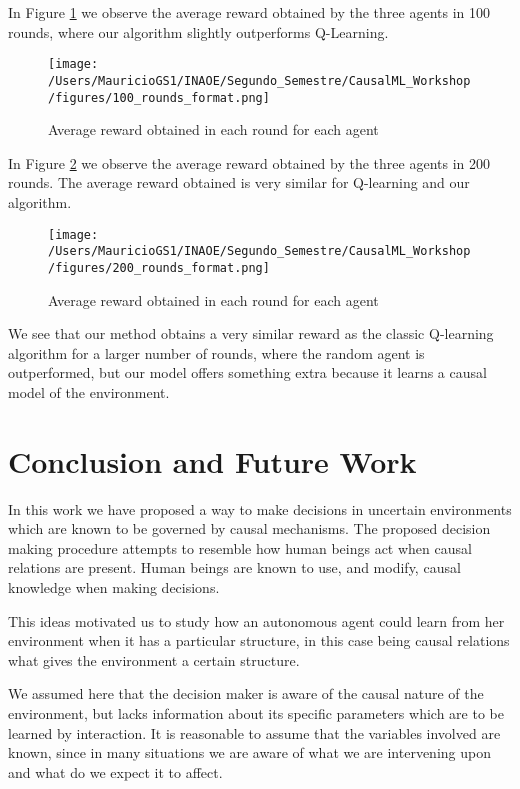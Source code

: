 \documentclass{article}
\begin{document}
In Figure \ref{100_rounds} we observe the average reward obtained by the three agents in 100 rounds, where our algorithm slightly outperforms Q-Learning.

\begin{figure}[ht]
\vskip 0.2in
\begin{center}
\centerline{\texttt{[image: /Users/MauricioGS1/INAOE/Segundo\_Semestre/CausalML\_Workshop/figures/100\_rounds\_format.png]}}
\caption{Average reward obtained in each round for each agent}
\label{100_rounds}
\end{center}
\vskip -0.2in
\end{figure}

In Figure \ref{200_rounds} we observe the average reward obtained by the three agents in 200 rounds. The average reward obtained is very similar for Q-learning and our algorithm.

\begin{figure}[ht]
\vskip 0.2in
\begin{center}
\centerline{\texttt{[image: /Users/MauricioGS1/INAOE/Segundo\_Semestre/CausalML\_Workshop/figures/200\_rounds\_format.png]}}
\caption{Average reward obtained in each round for each agent}
\label{200_rounds}
\end{center}
\vskip -0.2in
\end{figure}

We see that our method obtains a very similar reward as the classic Q-learning algorithm for a larger number of rounds, where the random agent is outperformed, but our model offers something extra because it learns a causal model of the environment. 

\section{Conclusion and Future Work}
In this work we have proposed a way to make decisions in uncertain environments which are known to be governed by causal mechanisms. The proposed decision making procedure attempts to resemble how human beings act when causal relations are present. Human beings are known to use, and modify, causal knowledge when making decisions. 

This ideas motivated us to study how an autonomous agent could learn from her environment when it has a particular structure, in this case being causal relations what gives the environment a certain structure. 

We assumed here that the decision maker is aware of the causal nature of the environment, but lacks information about its specific parameters which are to be learned by interaction. It is reasonable to assume that the variables involved are known, since in many situations we are aware of what we are intervening upon and what do we expect it to affect. 
\end{document}

